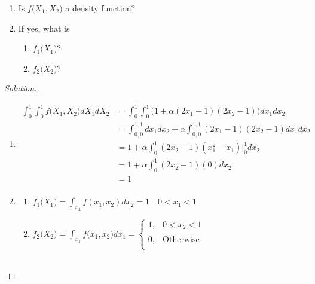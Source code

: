 \documentclass[11pt,a4paper]{article}
\theoremstyle{definition}
\newenvironment{solution}
  {\renewcommand{\qedsymbol}{}\begin{proof}[\textit{Solution}.]}
  {\end{proof}}
\begin{document}
\begin{enumerate}
\item Is $f\big(X_1,X_2\big)$ a density function?
\item If yes, what is
\begin{enumerate}
       \item $f_1\big(X_1\big)$?
       \item $f_2\big(X_2\big)$?\\
\end{enumerate}
\end{enumerate}



\begin{solution}
\begin{enumerate}
\item 
\begin{align*}
\int^1_0\int^1_0f\big(X_1,X_2\big) dX_1dX_2 & = \int^1_0\int^1_0 \big(1+\alpha(2x_1-1)(2x_2-1)\big)dx_1dx_2\\
                                            & = \int^{1,1}_{0,0} dx_1dx_2 + \alpha \int^{1,1}_{0,0}(2x_1-1)(2x_2-1)dx_1dx_2\\
                                            & = 1 + \alpha \int^1_0 (2x_2-1)(x^2_1-x_1)\big|^1_0dx_2\\
                                            & = 1 + \alpha \int^1_0(2x_2-1)(0)dx_2\\
                                            & = 1\\
\end{align*}


\item
\begin{enumerate}
      \item $\displaystyle{f_1\big(X_1\big) = \int_{x_2}f(x_1,x_2)dx_2}= 1\quad  0<x_1<1$\\
      \item $\displaystyle{f_2\big(X_2\big) = \int_{x_1} f\big(x_1,x_2\big)dx_1=
\begin{cases}      
      1, & 0<x_2 < 1\\\\
      0, & \text{Otherwise}\\
\end{cases}      
      }$\\\\
\end{enumerate}
\end{enumerate}
\end{solution}
\end{document}
